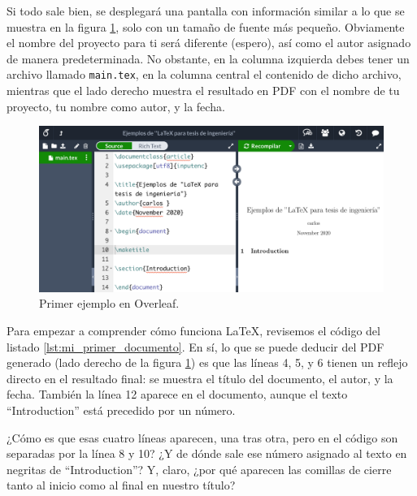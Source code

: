 Si todo sale bien, se desplegará una pantalla con información similar a lo que se muestra en la figura \ref{fig:overleaf_mi_primer_documento}, solo con un tamaño de fuente más pequeño. Obviamente el nombre del proyecto para ti será diferente (espero), así como el autor asignado de manera predeterminada. No obstante, en la columna izquierda debes tener un archivo llamado \texttt{main.tex}, en la columna central el contenido de dicho archivo, mientras que el lado derecho muestra el resultado en PDF con el nombre de tu proyecto, tu nombre como autor, y la fecha.

\begin{figure}[ht!]
	\centering
	\includegraphics[width=\linewidth]{img/overleaf_mi_primer_documento_300ppi.png}
	\caption{Primer ejemplo en Overleaf.}
	\label{fig:overleaf_mi_primer_documento}
\end{figure}

Para empezar a comprender cómo funciona \LaTeX, revisemos el código del listado \ref{lst:mi_primer_documento}. En sí, lo que se puede deducir del PDF generado (lado derecho de la figura \ref{fig:overleaf_mi_primer_documento}) es que las líneas 4, 5, y 6 tienen un reflejo directo en el resultado final: se muestra el título del documento, el autor, y la fecha. También la línea 12 aparece en el documento, aunque el texto ``Introduction'' está precedido por un número.

¿Cómo es que esas cuatro líneas aparecen, una tras otra, pero en el código son separadas por la línea 8 y 10? ¿Y de dónde sale ese número asignado al texto en negritas de ``Introduction''? Y, claro, ¿por qué aparecen las comillas de cierre tanto al inicio como al final en nuestro título?





